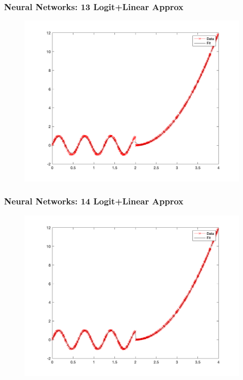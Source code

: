 \documentclass{beamer}
\begin{document}
\begin{frame}
\frametitle[alignment=center]{Neural Networks: 13 Logit+Linear Approx}
\begin{figure}
\includegraphics[scale=0.5]{NN_Example/Fig_Shallow_13.png}
\end{figure}
\end{frame}

\begin{frame}
\frametitle[alignment=center]{Neural Networks: 14  Logit+Linear Approx}
\begin{figure}
\includegraphics[scale=0.5]{NN_Example/Fig_Shallow_14.png}
\end{figure}
\end{frame}
\end{document}
